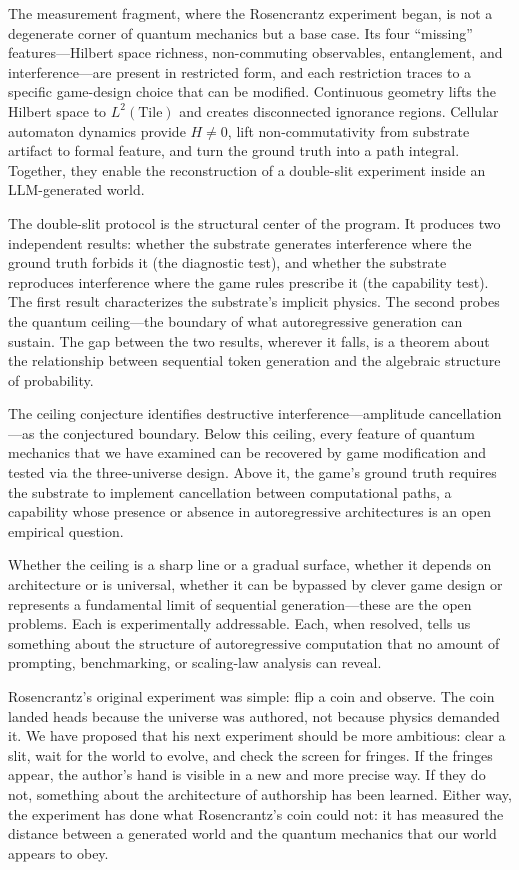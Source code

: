 \documentclass[12pt,a4paper]{article}
\theoremstyle{definition}
\theoremstyle{remark}
\begin{document}
The measurement fragment, where the Rosencrantz experiment began, is not a degenerate corner of quantum mechanics but a base case.  Its four ``missing'' features---Hilbert space richness, non-commuting observables, entanglement, and interference---are present in restricted form, and each restriction traces to a specific game-design choice that can be modified.  Continuous geometry lifts the Hilbert space to $L^2(\text{Tile})$ and creates disconnected ignorance regions.  Cellular automaton dynamics provide $H \neq 0$, lift non-commutativity from substrate artifact to formal feature, and turn the ground truth into a path integral.  Together, they enable the reconstruction of a double-slit experiment inside an LLM-generated world.

The double-slit protocol is the structural center of the program.  It produces two independent results: whether the substrate generates interference where the ground truth forbids it (the diagnostic test), and whether the substrate reproduces interference where the game rules prescribe it (the capability test).  The first result characterizes the substrate's implicit physics.  The second probes the quantum ceiling---the boundary of what autoregressive generation can sustain.  The gap between the two results, wherever it falls, is a theorem about the relationship between sequential token generation and the algebraic structure of probability.

The ceiling conjecture identifies destructive interference---amplitude cancellation---as the conjectured boundary.  Below this ceiling, every feature of quantum mechanics that we have examined can be recovered by game modification and tested via the three-universe design.  Above it, the game's ground truth requires the substrate to implement cancellation between computational paths, a capability whose presence or absence in autoregressive architectures is an open empirical question.

Whether the ceiling is a sharp line or a gradual surface, whether it depends on architecture or is universal, whether it can be bypassed by clever game design or represents a fundamental limit of sequential generation---these are the open problems.  Each is experimentally addressable.  Each, when resolved, tells us something about the structure of autoregressive computation that no amount of prompting, benchmarking, or scaling-law analysis can reveal.

Rosencrantz's original experiment was simple: flip a coin and observe.  The coin landed heads because the universe was authored, not because physics demanded it.  We have proposed that his next experiment should be more ambitious: clear a slit, wait for the world to evolve, and check the screen for fringes.  If the fringes appear, the author's hand is visible in a new and more precise way.  If they do not, something about the architecture of authorship has been learned.  Either way, the experiment has done what Rosencrantz's coin could not: it has measured the distance between a generated world and the quantum mechanics that our world appears to obey.
\end{document}
